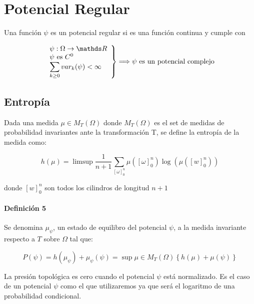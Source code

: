 \section{Potencial Regular}


Una función $\psi$ es un potencial regular si es una función continua y cumple con \cite{keller_equilibrium_1998}

\begin{align*}
\left. \begin{array}{l}
     \psi : \Omega \to \reals  \\
     \psi \text{ es } C^0 \\ 
     \displaystyle \sum_{k\geq0} var_k(\psi) < \infty
\end{array} \right\}
\Longrightarrow \psi \text{ es un potencial complejo}
\end{align*}

\subsection{Entropía}

Dada una medida $\mu \in M_T(\Omega)$ donde $M_T(\Omega)$  es el set de medidas de probabilidad invariantes ante la transformación T, se define la entropía de la medida como:

\begin{equation}
    h(\mu) = \limsup{\frac{1}{n+1} \sum_{[\omega]_0^n} \mu([\omega]_0^n) \log(\mu([w]_0^n))}
    \label{eqn:entropia}
\end{equation}

donde $[w]_0^n$ son todos los cilindros de longitud $n+1$

\paragraph{Definición 5} Se denomina $\mu_\psi$, un estado de equilibro del potencial $\psi$, a la medida invariante respecto a $T$ sobre $\Omega$ tal que:

\begin{equation}
    P(\psi) = h(\mu_\psi) + \mu_\psi (\psi) = \sup_{}\mu \in M_T(\Omega) \left\{ h(\mu)+\mu(\psi)\right\}
    \label{eqn:presiontopo}
\end{equation}

La presión topológica es cero cuando el potencial $\psi$ está normalizado. Es el caso de un potencial $\psi$ como el que utilizaremos ya que será el logaritmo de una probabilidad condicional\cite{keller_equilibrium_1998}.

